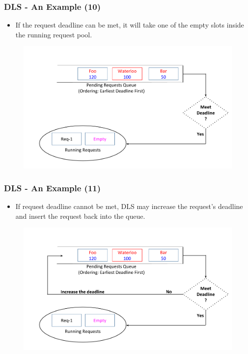 \documentclass{beamer}
\begin{document}
\begin{frame}
  \frametitle{DLS - An Example (10)}
  \begin{itemize}
  \item If the request deadline can be met, it will take one of the empty slots
    inside the running request pool.
    \newline
  \end{itemize}
  \vspace{-5 mm}
  \begin{figure}
    \begin{center}
      \centerline{\includegraphics[scale=0.33]{img/DLS_Example_ZOOM_4.png}}
    \end{center}
  \end{figure}
\end{frame}



\begin{frame}
  \frametitle{DLS - An Example (11)}
  \begin{itemize}
  \item If request deadline cannot be met, DLS may increase the request's
    deadline and insert the request back into the queue.
    \newline
  \end{itemize}
  \vspace{-5 mm}
  \begin{figure}
    \begin{center}
      \centerline{\includegraphics[scale=0.33]{img/DLS_Example_ZOOM_5.png}}
    \end{center}
  \end{figure}
\end{frame}
\end{document}
